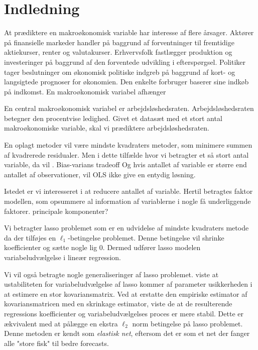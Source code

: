 \chapter{Indledning}
At prædiktere en makroøkonomisk variable har interesse af flere årsager.
Aktører på finansielle markeder handler på baggrund af forventninger til fremtidige aktiekurser, renter og valutakurser.
Erhvervsfolk fastlægger produktion og investeringer på baggrund af den forventede udvikling i efterspørgsel.
Politiker tager beslutninger om økonomisk politiske indgreb på baggrund af kort- og langsigtede prognoser for økonomien.
Den enkelte forbruger baserer sine indkøb på indkomst.
En makroøkonomisk variabel afhænger 

En central makroøkonomisk variabel er arbejdsløshedsraten.
Arbejdsløshedsraten betegner den procentvise ledighed.
Givet et datasæt med et stort antal makroøkonomiske variable, skal vi prædiktere arbejdsløshedsraten.

En oplagt metoder vil være mindste kvadraters metoder, som minimere summen af kvadrerede residualer.
Men i dette tilfælde hvor vi betragter et så stort antal variable, da vil .
Bias-varians tradeoff
Og hvis antallet af variable er større end antallet af observationer, vil OLS ikke give en entydig løsning.

Istedet er vi interesseret i at reducere antallet af variable.
Hertil betragtes faktor modellen, som opsummere al information af variablerne i nogle få underliggende faktorer.
principale komponenter?

Vi betragter lasso problemet som er en udvidelse af mindste kvadraters metode da der tilføjes en \(\ell_1\)-betingelse problemet.
Denne betingelse vil shrinke koefficienter og sætte nogle lig 0.
Dermed udfører lasso modelen variabeludvælgelse i lineær regression.

Vi vil også betragte nogle generaliseringer af lasso problemet.
\citep{zou_hastie} viste at ustabiliteten for variabeludvælgelse af lasso kommer af parameter usikkerheden i at estimere en stor kovariansmatrix.
Ved at erstatte den empiriske estimator af kovariansmatricen med en skrinkage estimator, viste de at de resulterende regressions koefficienter og variabeludvælgelses proces er mere stabil.
Dette er ækvivalent med at pålægge en ekstra \(\ell_2\) norm betingelse på lasso problemet.
Denne metoden er kendt som \textit{elastisk net}, eftersom det er som et net der fanger alle "store fisk" til bedre forecasts.

